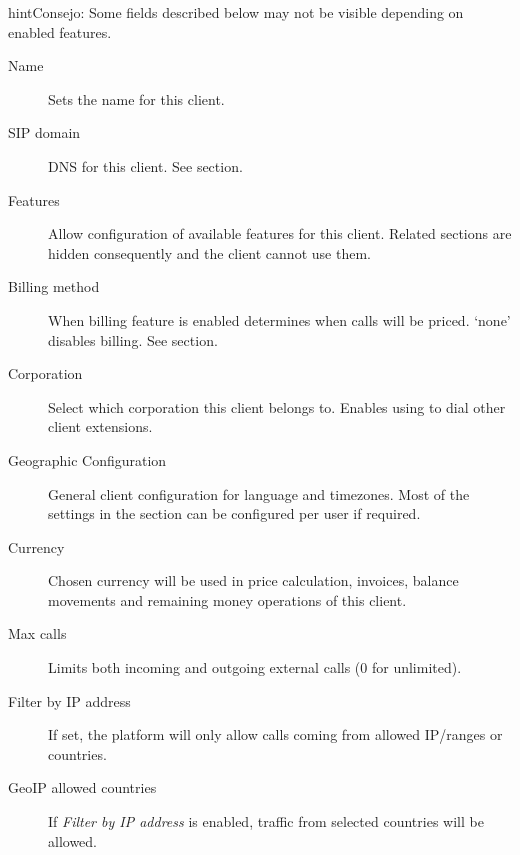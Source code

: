 \documentclass[letterpaper,10pt,spanish]{sphinxmanual}
\begin{document}
\begin{notice}{hint}{Consejo:}
Some fields described below may not be visible depending on enabled features.
\begin{description}
\item[{Name}] \leavevmode
Sets the name for this client.

\item[{SIP domain}] \leavevmode
DNS for this client. See {\hyperref[getting_started/internal_calls/brand_portal:client\string-sip\string-domain]{}} section.

\item[{Features}] \leavevmode
Allow configuration of available features for this client.
Related sections are hidden consequently and the client cannot use them.

\item[{Billing method}] \leavevmode
When billing feature is enabled determines when calls will be priced. `none' disables billing.
See {\hyperref[administration_portal/brand/billing/index:billing]{}} section.

\item[{Corporation}] \leavevmode
Select which corporation this client belongs to. Enables using {\hyperref[administration_portal/client/vpbx/routing_endpoints/friends/internal_friends:internal\string-friends]{}} to
dial other client extensions.

\item[{Geographic Configuration}] \leavevmode
General client configuration for language and timezones. Most of the settings in the section can be
configured per user if required.

\item[{Currency}] \leavevmode
Chosen currency will be used in price calculation, invoices, balance movements and
remaining money operations of this client.

\item[{Max calls}] \leavevmode
Limits both incoming and outgoing external calls (0 for unlimited).

\item[{Filter by IP address}] \leavevmode
If set, the platform will only allow calls coming from allowed IP/ranges or countries.

\item[{GeoIP allowed countries}] \leavevmode
If \emph{Filter by IP address} is enabled, traffic from selected countries will be allowed.


\end{description}
\end{notice}
\end{document}
